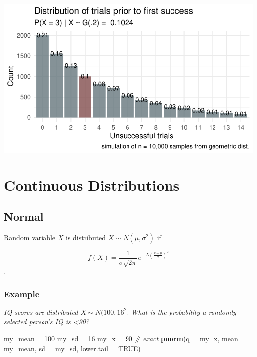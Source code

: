 \documentclass[
]{book}
\newenvironment{Shaded}{\begin{snugshade}}{\end{snugshade}}
\newcommand{\CommentTok}[1]{\textcolor[rgb]{0.56,0.35,0.01}{\textit{#1}}}
\newcommand{\DataTypeTok}[1]{\textcolor[rgb]{0.13,0.29,0.53}{#1}}
\newcommand{\DecValTok}[1]{\textcolor[rgb]{0.00,0.00,0.81}{#1}}
\newcommand{\KeywordTok}[1]{\textcolor[rgb]{0.13,0.29,0.53}{\textbf{#1}}}
\newcommand{\NormalTok}[1]{#1}
\newcommand{\OtherTok}[1]{\textcolor[rgb]{0.56,0.35,0.01}{#1}}
\newcommand{\StringTok}[1]{\textcolor[rgb]{0.31,0.60,0.02}{#1}}
\begin{document}
\includegraphics{data-sci_files/figure-latex/unnamed-chunk-12-1.pdf}

\hypertarget{continuous-distributions}{%
\section{Continuous Distributions}\label{continuous-distributions}}

\hypertarget{normal}{%
\subsection{Normal}\label{normal}}

Random variable \(X\) is distributed \(X \sim N(\mu, \sigma^2)\) if

\[f(X)=\frac{{1}}{{\sigma \sqrt{{2\pi}}}}e^{-.5(\frac{{x-\mu}}{{\sigma}})^2}\].

\hypertarget{example}{%
\subsubsection*{Example}\label{example}}

\emph{IQ scores are distributed \(X \sim N(100, 16^2\). What is the probability a randomly selected person's IQ is \textless90?}

\begin{Shaded}
\begin{Highlighting}[]
\NormalTok{my_mean =}\StringTok{ }\DecValTok{100}
\NormalTok{my_sd =}\StringTok{ }\DecValTok{16}
\NormalTok{my_x =}\StringTok{ }\DecValTok{90}
\CommentTok{# exact}
\KeywordTok{pnorm}\NormalTok{(}\DataTypeTok{q =}\NormalTok{ my_x, }\DataTypeTok{mean =}\NormalTok{ my_mean, }\DataTypeTok{sd =}\NormalTok{ my_sd, }\DataTypeTok{lower.tail =} \OtherTok{TRUE}\NormalTok{)}
\end{Highlighting}
\end{Shaded}
\end{document}

